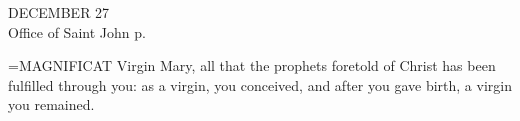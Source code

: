 \begin{center}\normalsize DECEMBER 27\\
\footnotesize Office of Saint John p. \pageref{propers:john}\\
\end{center}

\hangindent=\parindent \small{MAGNIFICAT      Virgin Mary, all that the prophets foretold of Christ has been fulfilled through you: as a virgin, you conceived, and after you gave birth, a virgin you remained.\\}

